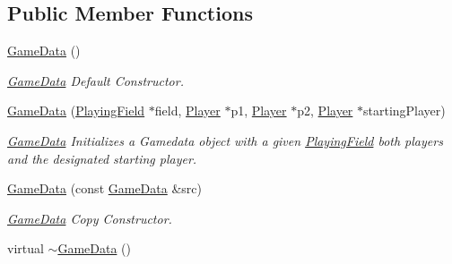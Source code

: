 \subsection*{Public Member Functions}
\begin{DoxyCompactItemize}
\item 
\hypertarget{classGameData_a67ab18c5a35df618e99983275c7552ab}{\hyperlink{classGameData_a67ab18c5a35df618e99983275c7552ab}{Game\-Data} ()}\label{classGameData_a67ab18c5a35df618e99983275c7552ab}

\begin{DoxyCompactList}\small\item\em \hyperlink{classGameData}{Game\-Data} Default Constructor. \end{DoxyCompactList}\item 
\hyperlink{classGameData_aea94874f6fb34c81daf86ab294a3e094}{Game\-Data} (\hyperlink{classPlayingField}{Playing\-Field} $\ast$field, \hyperlink{classPlayer}{Player} $\ast$p1, \hyperlink{classPlayer}{Player} $\ast$p2, \hyperlink{classPlayer}{Player} $\ast$starting\-Player)
\begin{DoxyCompactList}\small\item\em \hyperlink{classGameData}{Game\-Data} Initializes a Gamedata object with a given \hyperlink{classPlayingField}{Playing\-Field} both players and the designated starting player. \end{DoxyCompactList}\item 
\hyperlink{classGameData_ae0f631bbb4bf25dd4e3888a5ef9a4eb6}{Game\-Data} (const \hyperlink{classGameData}{Game\-Data} \&src)
\begin{DoxyCompactList}\small\item\em \hyperlink{classGameData}{Game\-Data} Copy Constructor. \end{DoxyCompactList}\item 
\hypertarget{classGameData_abd51e710bc262e278a8895f2e0b35a9f}{virtual \hyperlink{classGameData_abd51e710bc262e278a8895f2e0b35a9f}{$\sim$\-Game\-Data} ()}\label{classGameData_abd51e710bc262e278a8895f2e0b35a9f}


\end{DoxyCompactItemize}
